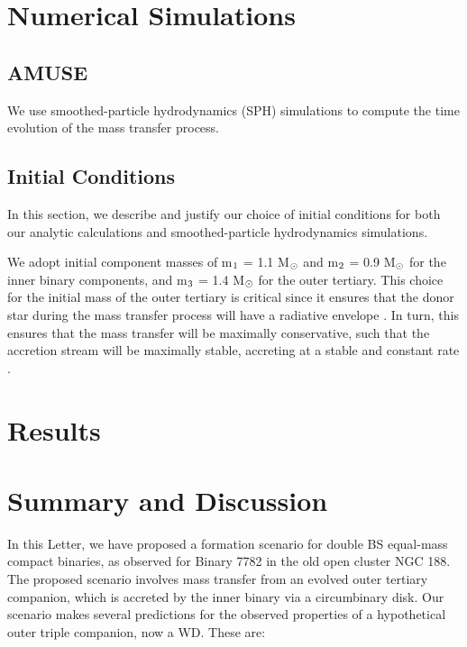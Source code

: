 \documentclass[useAMS,usenatbib]{mnras}
\begin{document}
\begin{figure}
{\label{fig:fig1}}
\end{figure}

\section{Numerical Simulations} \label{sims}

\subsection{AMUSE} \label{amuse}

We use smoothed-particle hydrodynamics (SPH) simulations to compute the time evolution of the mass transfer process.  

\subsection{Initial Conditions} \label{ICs}

In this section, we describe and justify our choice of initial conditions for both our analytic calculations and smoothed-particle hydrodynamics simulations.

We adopt initial component masses of m$_{\rm 1}$ = 1.1 M$_{\rm \odot}$ and m$_{\rm 2}$ = 0.9 M$_{\rm \odot}$ for the inner binary components, and m$_{\rm 3}$ = 1.4 M$_{\rm \odot}$ for the outer tertiary.  This choice for the initial mass of the outer tertiary is critical since it ensures that the donor star during the mass transfer process will have a radiative envelope \citep[e.g.][]{maeder09}.  In turn, this ensures that the mass transfer will be maximally conservative, such that the accretion stream will be maximally stable, accreting at a stable and constant rate \citep[e.g.][]{iben91}.  

\section{Results} \label{results}


\section{Summary and Discussion} \label{discussion}

In this Letter, we have proposed a formation scenario for double BS equal-mass compact binaries, as observed for Binary 7782 in the old open cluster NGC 188.  The proposed scenario involves mass transfer from an evolved outer tertiary companion, which is accreted by the inner binary via a circumbinary disk.  Our scenario makes several predictions for the observed properties of a hypothetical outer triple companion, now a WD.  These are:
\end{document}
